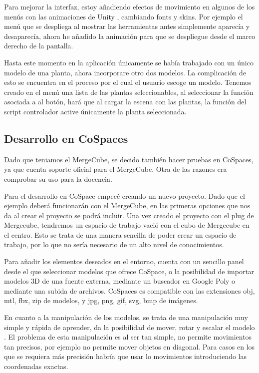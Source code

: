 Para mejorar la interfaz, estoy añadiendo efectos de movimiento en algunos de los menús con las animaciones de Unity , cambiando fonts y skins. Por ejemplo el menú que se despliega al mostrar las herramientas antes simplemente aparecía y desaparecía, ahora he añadido la animación para que se despliegue desde el marco derecho de la pantalla.


Hasta este momento en la aplicación únicamente se había trabajado con un único modelo de una planta, ahora incorporare otro dos modelos.  La complicación de esto se encuentra en el proceso por el cual el usuario escoge un modelo. Tenemos creado en el menú una lista de las plantas seleccionables, al seleccionar la función asociada a al botón, hará que al cargar la escena con las plantas, la función del script controlador active únicamente la planta seleccionada.



\subsection{Desarrollo en CoSpaces}
Dado que teniamos el MergeCube, se decido también hacer pruebas en CoSpaces, ya que cuenta soporte oficial para el MergeCube. Otra de las razones era comprobar su uso para la docencia.

Para el desarrollo en CoSpace empecé creando un nuevo proyecto. Dado que el ejemplo deberá funcionarán con el MergeCube, en las primeras opciones que nos da al crear el proyecto se podrá incluir.
Una vez creado el proyecto con el plug de Mergecube, tendremos un espacio de trabajo vació con el cubo de Mergecube en el centro. Esto se trata de una manera sencilla de poder crear un espacio de trabajo, por lo que no sería necesario de un alto nivel de conocimientos.

Para añadir los elementos deseados en el entorno, cuenta con un sencillo panel desde el que seleccionar modelos que ofrece CoSpace, o la posibilidad de importar modelos 3D de una fuente externa, mediante un buscador en Google Poly o mediante una subida de archivos. CoSpaces es compatible con las extensiones obj, mtl, fbx, zip de modelos, y jpg, png, gif, svg, bmp de imágenes.

En cuanto a la manipulación de los modelos, se trata de una manipulación muy simple y rápida de aprender, da la posibilidad de mover, rotar y escalar el modelo . El problema de esta manipulación es al ser tan simple, no permite movimientos tan precisos, por ejemplo no permite mover objetos en diagonal. Para casos en los que se requiera más precisión habría que usar lo movimientos introduciendo las coordenadas exactas.

